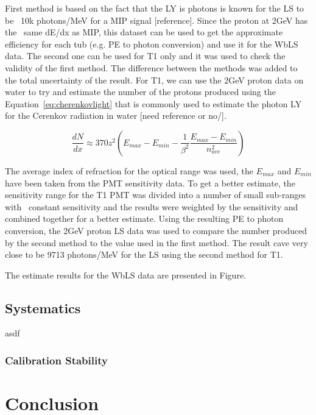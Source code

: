 \documentclass[preprint,12pt]{elsarticle}
\begin{document}
First method is based on the fact that the LY is photons is known for the LS to be ~10k photons/MeV for a MIP signal [reference]. Since the proton at 2GeV has the ~same dE/dx as MIP, this dataset can be used to get the approximate efficiency for each tub (e.g. PE to photon conversion) and use it for the WbLS data. The second one can be used for T1 only and it was used to check the validity of the first method. The difference between the methods was added to the total uncertainty of the result. For T1, we can use the 2GeV proton data on water to try and estimate the number of the protons produced using the Equation~\ref{eq:cherenkovlight} that is commonly used to estimate the photon LY for the Cerenkov radiation in water [need reference or no/].

\begin{equation} \frac{dN}{dx} \approx 370 z^2 (E_{max} - E_{min} - \frac{1}{\beta^2} \frac{E_{max} - E_{min}}{n^2_{ave}}) \label{eq:cherenkovlight} \end{equation}

The average index of refraction for the optical range was used, the $E_{max}$ and $E_{min}$ have been taken from the PMT sensitivity data. To get a better estimate, the sensitivity range for the T1 PMT was divided into a number of small sub-ranges with ~constant sensitivity and the results were weighted by the sensitivity and combined together for a better estimate. Using the resulting PE to photon conversion, the 2GeV proton LS data was used to compare the number produced by the second method to the value used in the first method. The result cave very close to be 9713 photons/MeV for the LS using the second method for T1.

The estimate results for the WbLS data are presented in Figure.




\subsection{Systematics}
\label{systematicssection}

asdf

\subsubsection{Calibration Stability}
\label{calibstabilitysection}

 \section{Conclusion}
 \label{conclusionsection}
\end{document}
